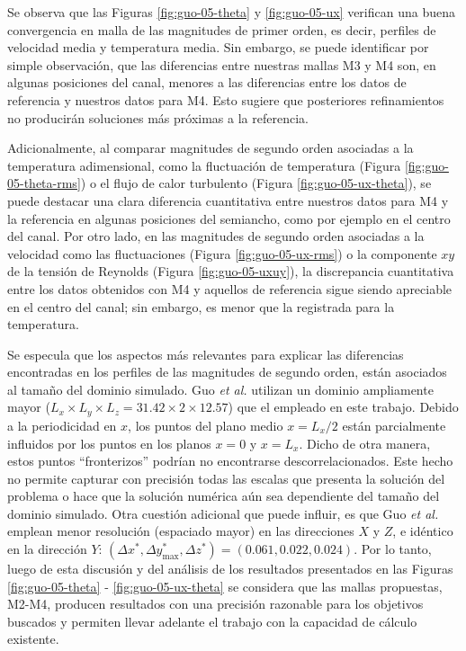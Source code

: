 Se observa que las Figuras \ref{fig:guo-05-theta} y \ref{fig:guo-05-ux} verifican una buena convergencia en malla de las  magnitudes de primer orden, es decir, perfiles de velocidad media y temperatura media. Sin embargo, se puede identificar por simple observación, que las diferencias entre nuestras mallas M3 y M4 son, en algunas posiciones del canal, menores a las diferencias entre los datos de referencia y nuestros datos para M4. Esto sugiere que posteriores refinamientos no producirán soluciones más próximas a la referencia. 

Adicionalmente, al comparar magnitudes de segundo orden asociadas a la temperatura adimensional, como la fluctuación de temperatura (Figura \ref{fig:guo-05-theta-rms}) o el flujo de calor turbulento (Figura \ref{fig:guo-05-ux-theta}), se puede destacar una clara diferencia cuantitativa entre nuestros datos para M4 y la referencia en algunas posiciones del semiancho, como por ejemplo en el centro del canal. Por otro lado, en las magnitudes de segundo orden asociadas a la velocidad como las fluctuaciones (Figura \ref{fig:guo-05-ux-rms}) o la componente $xy$ de la tensión de Reynolds (Figura \ref{fig:guo-05-uxuy}), la discrepancia cuantitativa entre los datos obtenidos con M4 y aquellos de referencia sigue siendo apreciable en el centro del canal; sin embargo, es menor que la registrada para la temperatura.

Se especula que los aspectos más relevantes para explicar las diferencias encontradas en los perfiles de las magnitudes de segundo orden, están asociados al tamaño del dominio simulado. Guo \textit{et al.} utilizan un dominio ampliamente mayor ($L_x \times L_y \times L_z = 31\text{.}42 \times 2 \times 12\text{.}57$) que el empleado en este trabajo. Debido a la periodicidad en $x$, los puntos del plano medio $x = L_x/2$ están parcialmente influidos por los puntos en los planos $x=0$ y $x=L_x$. Dicho de otra manera, estos puntos ``fronterizos'' podrían no encontrarse descorrelacionados. Este hecho no permite capturar con precisión todas las escalas que presenta la solución del problema o hace que la solución numérica aún sea dependiente del tamaño del dominio simulado. Otra cuestión adicional que puede influir, es que Guo \textit{et al.} emplean menor resolución (espaciado mayor) en las direcciones $X$ y $Z$, e idéntico en la dirección $Y$: $(\Delta x^*,\Delta y^*_{\text{max}},\Delta z^*) = (0\text{.}061, 0\text{.}022, 0\text{.}024)$. Por lo tanto, luego de esta discusión y del análisis de los resultados presentados en las Figuras \ref{fig:guo-05-theta} - \ref{fig:guo-05-ux-theta} se considera que las mallas propuestas, M2-M4, producen resultados con una precisión razonable para los objetivos buscados y permiten llevar adelante el trabajo con la capacidad de cálculo existente. 

